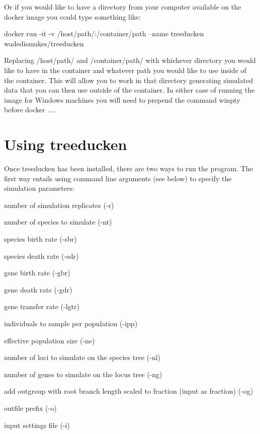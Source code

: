 Or if you would like to have a directory from your computer available on the docker image you could type something like\+: \begin{DoxyVerb}docker run -it -v /host/path/:/container/path --name treeducken wadedismukes/treeducken
\end{DoxyVerb}


Replacing {\ttfamily /host/path/} and {\ttfamily /container/path/} with whichever directory you would like to have in the container and whatever path you would like to use inside of the container. This will allow you to work in that directory generating simulated data that you can then use outside of the container. In either case of running the image for Windows machines you will need to prepend the command {\ttfamily winpty} before {\ttfamily docker ...}.

\section*{Using treeducken}

Once treeducken has been installed, there are two ways to run the program. The first way entails using command line arguments (see below) to specify the simulation parameters\+:


\begin{DoxyItemize}
\item number of simulation replicates ({\ttfamily -\/r})
\item number of species to simulate ({\ttfamily -\/nt})
\item species birth rate ({\ttfamily -\/sbr})
\item species death rate ({\ttfamily -\/sdr})
\item gene birth rate ({\ttfamily -\/gbr})
\item gene death rate ({\ttfamily -\/gdr})
\item gene transfer rate ({\ttfamily -\/lgtr})
\item individuals to sample per population ({\ttfamily -\/ipp})
\item effective population size ({\ttfamily -\/ne})
\item number of loci to simulate on the species tree ({\ttfamily -\/nl})
\item number of genes to simulate on the locus tree ({\ttfamily -\/ng})
\item add outgroup with root branch length scaled to fraction (input as fraction) ({\ttfamily -\/og})
\item outfile prefix ({\ttfamily -\/o})
\item input settings file ({\ttfamily -\/i})
\end{DoxyItemize}

